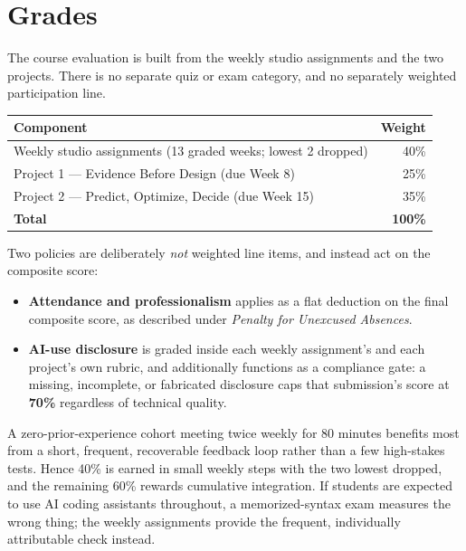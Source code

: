 \documentclass[11pt]{article}
\begin{document}
\section{Grades}

The course evaluation is built from the weekly studio assignments and the two projects. There
is no separate quiz or exam category, and no separately weighted participation line.

\begin{center}
\begin{tabular}{@{}lr@{}}
\toprule
\textbf{Component} & \textbf{Weight} \\
\midrule
Weekly studio assignments (13 graded weeks; lowest 2 dropped) & 40\% \\
Project 1 --- Evidence Before Design (due Week 8)              & 25\% \\
Project 2 --- Predict, Optimize, Decide (due Week 15)          & 35\% \\
\midrule
\textbf{Total} & \textbf{100\%} \\
\bottomrule
\end{tabular}
\end{center}

Two policies are deliberately \emph{not} weighted line items, and instead act on the composite
score:

\begin{itemize}
  \item \textbf{Attendance and professionalism} applies as a flat deduction on the final
        composite score, as described under \textit{Penalty for Unexcused Absences}.
  \item \textbf{AI-use disclosure} is graded inside each weekly assignment's and each
        project's own rubric, and additionally functions as a compliance gate: a missing,
        incomplete, or fabricated disclosure caps that submission's score at \textbf{70\%}
        regardless of technical quality.
\end{itemize}

A zero-prior-experience cohort meeting twice weekly for 80 minutes benefits most from a short,
frequent, recoverable feedback loop rather than a few high-stakes tests. Hence 40\% is earned
in small weekly steps with the two lowest dropped, and the remaining 60\% rewards cumulative
integration. If students are expected to use AI coding assistants throughout, a
memorized-syntax exam measures the wrong thing; the weekly assignments provide the frequent,
individually attributable check instead.
\end{document}
